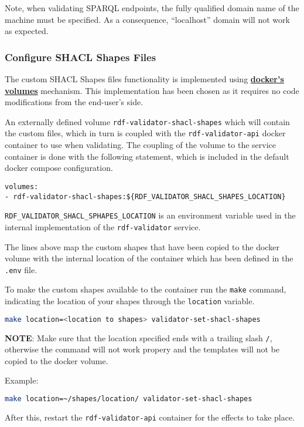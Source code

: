 Note, when validating SPARQL endpoints, the fully qualified domain name of the machine must be specified. As a consequence, ``localhost'' domain will not work as expected.

\subsubsection{Configure SHACL Shapes Files}
\label{sec:rdf-validator-ss}
The custom SHACL Shapes files functionality is implemented using \textbf{\href{https://docs.docker.com/storage/volumes/}{docker's volumes}} mechanism. This implementation has been chosen as it requires no code modifications from the end-user's side.

An externally defined volume \texttt{rdf-validator-shacl-shapes} which will contain the custom files, which in turn is coupled with the \texttt{rdf-validator-api} docker container to use when validating.  The coupling of the volume to the service container is done with the following statement, which is included in the default docker compose configuration.

\begin{lstlisting}[]
volumes:
- rdf-validator-shacl-shapes:${RDF_VALIDATOR_SHACL_SHAPES_LOCATION}
\end{lstlisting}

\texttt{RDF\_VALIDATOR\_SHACL\_SPHAPES\_LOCATION} is an environment variable used in the internal implementation of the \texttt{rdf-validator} service.

The lines above map the custom shapes that have been copied to the docker volume with the internal location of the container which has been defined in the \texttt{.env} file.

To make the custom shapes available to the container run the \texttt{make} command, indicating the location of your shapes through the \texttt{location} variable.
\begin{lstlisting}[language=bash]
make location=<location to shapes> validator-set-shacl-shapes
\end{lstlisting}

\textbf{NOTE}: Make sure that the location specified ends with a trailing slash \texttt{/}, otherwise the command will not work propery and the templates will not be copied to the docker volume.

Example:
\begin{lstlisting}[language=bash]
make location=~/shapes/location/ validator-set-shacl-shapes
	\end{lstlisting}

After this, restart the \texttt{rdf-validator-api} container for the effects to take place.

